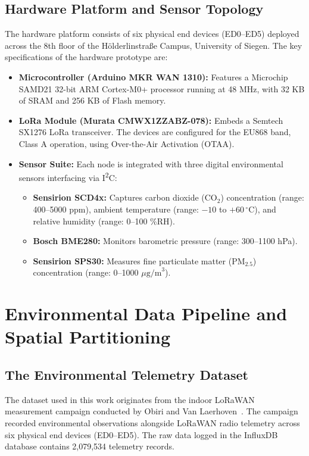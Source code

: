 \subsection{Hardware Platform and Sensor Topology}
The hardware platform consists of six physical end devices (ED0–ED5) deployed across the 8th floor of the Hölderlinstraße Campus, University of Siegen. The key specifications of the hardware prototype are:
\begin{itemize}
    \item \textbf{Microcontroller (Arduino MKR WAN 1310):} Features a Microchip SAMD21 32-bit ARM Cortex-M0+ processor running at 48 MHz, with 32 KB of SRAM and 256 KB of Flash memory.
    \item \textbf{LoRa Module (Murata CMWX1ZZABZ-078):} Embeds a Semtech SX1276 LoRa transceiver. The devices are configured for the EU868 band, Class A operation, using Over-the-Air Activation (OTAA).
    \item \textbf{Sensor Suite:} Each node is integrated with three digital environmental sensors interfacing via I\textsuperscript{2}C:
    \begin{itemize}
        \item \textbf{Sensirion SCD4x:} Captures carbon dioxide ($\text{CO}_2$) concentration (range: 400--5000 ppm), ambient temperature (range: $-10$ to $+60\,^{\circ}\text{C}$), and relative humidity (range: 0--100 \%RH).
        \item \textbf{Bosch BME280:} Monitors barometric pressure (range: 300--1100 hPa).
        \item \textbf{Sensirion SPS30:} Measures fine particulate matter ($\text{PM}_{2.5}$) concentration (range: 0--1000 $\mu\text{g/m}^3$).
    \end{itemize}
\end{itemize}

\section{Environmental Data Pipeline and Spatial Partitioning}
\label{sec:data-pipeline}

\subsection{The Environmental Telemetry Dataset}
The dataset used in this work originates from the indoor LoRaWAN measurement campaign conducted by Obiri and Van Laerhoven~\cite{obiri2024comprehensive}. The campaign recorded environmental observations alongside LoRaWAN radio telemetry across six physical end devices (ED0–ED5). The raw data logged in the InfluxDB database contains 2,079,534 telemetry records.

